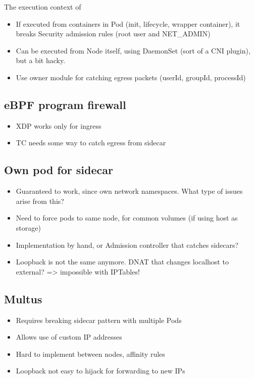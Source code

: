 \documentclass[english, 12pt, a4paper, sci, utf8, a-2b, online]{aaltothesis}
\begin{document}
The execution context of

\begin{itemize}
  \item If executed from containers in Pod (init, lifecycle, wrapper container), it breaks Security admission rules (root user and NET\_ADMIN)
  \item Can be executed from Node itself, using DaemonSet (sort of a CNI plugin), but a bit hacky.
  \item Use owner module for catching egress packets (userId, groupId, processId)
\end{itemize}

\subsection{eBPF program firewall}

\begin{itemize}
  \item XDP works only for ingress
  \item TC needs some way to catch egress from sidecar
\end{itemize}

\subsection{Own pod for sidecar}

\begin{itemize}
  \item Guaranteed to work, since own network namespaces. What type of issues arise from this?
  \item Need to force pods to same node, for common volumes (if using host as storage)
  \item Implementation by hand, or Admission controller that catches sidecars?
  \item Loopback is not the same anymore. DNAT that changes localhost to external? => impossible with IPTables!
\end{itemize}

\subsection{Multus}

\begin{itemize}
  \item Requires breaking sidecar pattern with multiple Pods
  \item Allows use of custom IP addresses
  \item Hard to implement between nodes, affinity rules
  \item Loopback not easy to hijack for forwarding to new IPs
\end{itemize}
\end{document}
